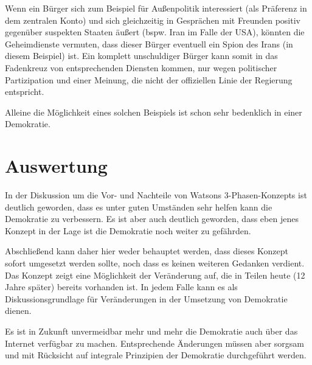 \documentclass[12pt,twoside,ngerman]{scrartcl}
\theoremstyle{plain}
\theoremstyle{definition}
\theoremstyle{remark}
\begin{document}
	Wenn ein Bürger sich zum Beispiel für Außenpolitik interessiert (als Präferenz in dem zentralen Konto) und sich gleichzeitig in Gesprächen mit Freunden positiv gegenüber suspekten Staaten äußert (bspw. Iran im Falle der USA), könnten die Geheimdienste vermuten, dass dieser Bürger eventuell ein Spion des Irans (in diesem Beispiel) ist. Ein komplett unschuldiger Bürger kann somit in das Fadenkreuz von entsprechenden Diensten kommen, nur wegen politischer Partizipation und einer Meinung, die nicht der offiziellen Linie der Regierung entspricht.
	
	Alleine die Möglichkeit eines solchen Beispiels ist schon sehr bedenklich in einer Demokratie.
\section{Auswertung}
\label{sec:concl}

	In der Diskussion um die Vor- und Nachteile von Watsons 3-Phasen-Konzepts ist deutlich geworden, dass es unter guten Umständen sehr helfen kann die Demokratie zu verbessern. Es ist aber auch deutlich geworden, dass eben jenes Konzept in der Lage ist die Demokratie noch weiter zu gefährden.
	
	Abschließend kann daher hier weder behauptet werden, dass dieses Konzept sofort umgesetzt werden sollte, noch dass es keinen weiteren Gedanken verdient. Das Konzept zeigt eine Möglichkeit der Veränderung auf, die in Teilen heute (12 Jahre später) bereits vorhanden ist. In jedem Falle kann es als Diskussionsgrundlage für Veränderungen in der Umsetzung von Demokratie dienen.
	
	Es ist in Zukunft unvermeidbar mehr und mehr die Demokratie auch über das Internet verfügbar zu machen. Entsprechende Änderungen müssen aber sorgsam und mit Rücksicht auf integrale Prinzipien der Demokratie durchgeführt werden.

%
%


\end{document}
